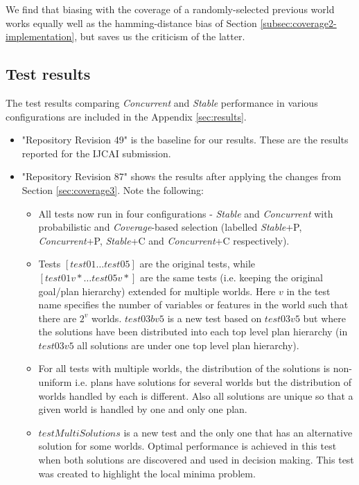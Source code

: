 \documentclass[a4paper]{article}
\newcommand{\cc}{\emph{Concurrent}\xspace}
\newcommand{\st}{\emph{Stable}\xspace}
\newcommand{\cov}{\emph{Coverage}\xspace}
\begin{document}
We find that biasing with the coverage of a randomly-selected previous world works equally well as the hamming-distance bias of Section \ref{subsec:coverage2-implementation}, but saves us the criticism of the latter.


\subsection{Test results}

The test results comparing \cc and \st performance in various configurations are included in the Appendix \ref{sec:results}.
\begin{itemize}
\item "Repository Revision 49" is the baseline for our results. These are the results reported for the IJCAI submission.
\item "Repository Revision 87" shows the results after applying the changes from Section \ref{sec:coverage3}. Note the following:
\begin{itemize}
\item All tests now run in four configurations - \st and \cc with probabilistic and \cov-based selection (labelled {\st}+P, {\cc}+P, {\st}+C and {\cc}+C respectively).
\item Tests $[test01 \ldots test05]$ are the original tests, while  $[test01v* \ldots test05v*]$ are the same tests (i.e. keeping the original goal/plan hierarchy) extended for multiple worlds. Here $v$ in the test name specifies the number of variables or features in the world such that there are $2^v$ worlds. $test03bv5$ is a new test based on $test03v5$ but where the solutions have been distributed into each top level plan hierarchy (in $test03v5$ all solutions are under one top level plan hierarchy).
\item For all tests with multiple worlds, the distribution of the solutions is non-uniform i.e. plans have solutions for several worlds but the distribution of worlds handled by each is different. Also all solutions are unique so that a given world is handled by one and only one plan.
\item $testMultiSolutions$ is a new test and the only one that has an alternative solution for some worlds. Optimal performance is achieved in this test when both solutions are discovered and used in decision making. This test was created to highlight the local minima problem.
\end{itemize}
\end{itemize}
\end{document}
